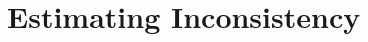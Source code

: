 \documentclass[letterpaper]{article} %
\newcommand{\roni}[1]{{\textcolor{green}{[Roni: #1]}}}
\begin{document}

\section{Estimating Inconsistency}



\end{document}
